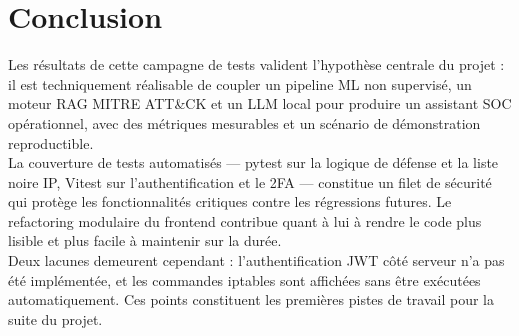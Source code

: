 \documentclass[12pt,a4paper]{report}
\begin{document}
\section*{Conclusion}
\begin{onehalfspace}
Les résultats de cette campagne de tests valident l'hypothèse centrale du
projet : il est techniquement réalisable de coupler un pipeline ML non
supervisé, un moteur RAG MITRE ATT\&CK et un LLM local pour produire un
assistant SOC opérationnel, avec des métriques mesurables et un scénario
de démonstration reproductible.\\

La couverture de tests automatisés — pytest sur la logique de défense et
la liste noire IP, Vitest sur l'authentification et le 2FA — constitue un
filet de sécurité qui protège les fonctionnalités critiques contre les
régressions futures. Le refactoring modulaire du frontend contribue quant
à lui à rendre le code plus lisible et plus facile à maintenir sur la durée.\\

Deux lacunes demeurent cependant : l'authentification JWT côté serveur
n'a pas été implémentée, et les commandes iptables sont affichées sans être
exécutées automatiquement. Ces points constituent les premières pistes de
travail pour la suite du projet.
\end{onehalfspace}

\newpage

\end{document}
